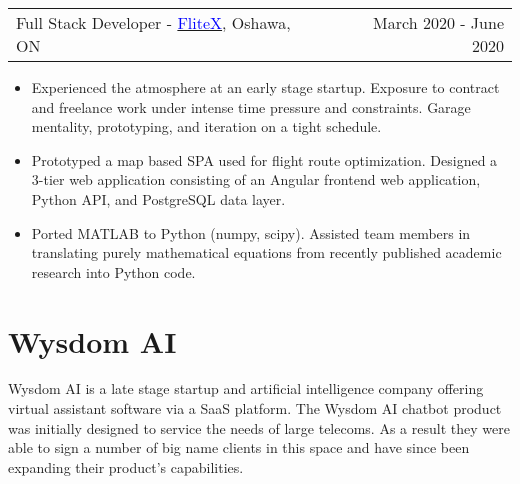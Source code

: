 \documentclass[margin]{res}
\begin{document}
\begin{resume}
	\begin{tabular}{p{3in} r} %
		Full Stack Developer - \href{https://flitex.net/}{\textcolor{blue}{FliteX}}, Oshawa, ON & March 2020 - June 2020
	\end{tabular}
	\begin{itemize} %
		\item Experienced the atmosphere at an early stage startup. Exposure to contract and freelance
		      work under intense time pressure and constraints. Garage mentality, prototyping, and iteration
		      on a tight schedule.
		\item Prototyped a map based SPA used for flight route optimization. Designed a 3-tier
		      web application consisting of an Angular frontend web application, Python API, and PostgreSQL
		      data layer.
		\item Ported MATLAB to Python (numpy, scipy). Assisted team members in translating purely mathematical equations from recently published academic research into Python code.
	\end{itemize}

	\normalsize{\section{Wysdom AI}}

	Wysdom AI is a late stage startup and artificial intelligence company offering virtual assistant software
	via a SaaS platform. The Wysdom AI chatbot product was initially designed to service the needs of
	large telecoms. As a result they were able to sign a number of big name clients in this space and have
	since been expanding their product's capabilities.


\end{resume}
\end{document}

